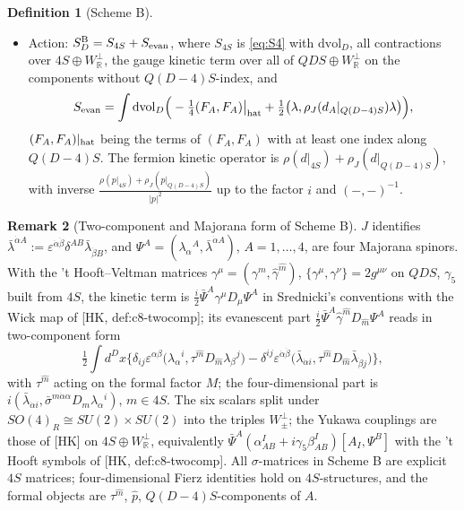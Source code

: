 \documentclass[11pt]{article}
\theoremstyle{definition}
\newtheorem{definition}{Definition}[section]
\newtheorem{remark}[definition]{Remark}
\numberwithin{equation}{section}
\begin{document}
\begin{definition}[Scheme B]
\begin{itemize}
\item Action: $S^{\rm B}_D=S_{4S}+S_{\rm evan}$, where $S_{4S}$ is \eqref{eq:S4} with $\mathrm{dvol}_D$, all contractions over $4S\oplus W^\perp_{\mathbb R}$, the gauge kinetic term over all of $QDS\oplus W^\perp_{\mathbb R}$ on the components without $Q(D{-}4)S$-index, and
\[
S_{\rm evan}=\int\mathrm{dvol}_D\Big(-\tfrac14(F_A,F_A)\big|_{\rm hat}+\tfrac12\big(\lambda,\rho_J(d_A|_{Q(D-4)S})\lambda\big)\Big),
\]
$(F_A,F_A)|_{\rm hat}$ being the terms of $(F_A,F_A)$ with at least one index along $Q(D{-}4)S$. The fermion kinetic operator is $\rho(d|_{4S})+\rho_J(d|_{Q(D-4)S})$, with inverse $\frac{\rho(p|_{4S})+\rho_J(p|_{Q(D-4)S})}{|p|^2}$ up to the factor $i$ and $(-,-)^{-1}$.
\end{itemize}
\end{definition}

\begin{remark}[Two-component and Majorana form of Scheme B]
\label{rem:B2c}
$J$ identifies $\bar\lambda^{\dot\alpha A}:=\varepsilon^{\dot\alpha\dot\beta}\delta^{AB}\bar\lambda_{\dot\beta B}$, and $\Psi^A=(\lambda_\alpha{}^A,\bar\lambda^{\dot\alpha A})$, $A=1,\dots,4$, are four Majorana spinors. With the 't Hooft--Veltman matrices $\gamma^\mu=(\gamma^m,\hat\gamma^{\hat m})$, $\{\gamma^\mu,\gamma^\nu\}=2g^{\mu\nu}$ on $QDS$, $\gamma_5$ built from $4S$, the kinetic term is $\frac i2\bar\Psi^A\gamma^\mu D_\mu\Psi^A$ in Srednicki's conventions with the Wick map of [HK, def:c8-twocomp]; its evanescent part $\frac i2\bar\Psi^A\hat\gamma^{\hat m}D_{\hat m}\Psi^A$ reads in two-component form
\[
\tfrac12\int d^Dx\Big\{\delta_{ij}\varepsilon^{\alpha\beta}\big(\lambda_\alpha{}^i,\tau^{\hat m}D_{\hat m}\lambda_\beta{}^j\big)-\delta^{ij}\varepsilon^{\dot\alpha\dot\beta}\big(\bar\lambda_{\dot\alpha i},\tau^{\hat m}D_{\hat m}\bar\lambda_{\dot\beta j}\big)\Big\},
\]
with $\tau^{\hat m}$ acting on the formal factor $M$; the four-dimensional part is $i(\bar\lambda_{\dot\alpha i},\bar\sigma^{m\dot\alpha\alpha}D_m\lambda_\alpha{}^i)$, $m\in 4S$. The six scalars split under $SO(4)_R\cong SU(2)\times SU(2)$ into the triples $W^\perp_\pm$; the Yukawa couplings are those of [HK] on $4S\oplus W^\perp_{\mathbb R}$, equivalently $\bar\Psi^A(\alpha^I_{AB}+i\gamma_5\beta^I_{AB})[A_I,\Psi^B]$ with the 't Hooft symbols of [HK, def:c8-twocomp]. All $\sigma$-matrices in Scheme B are explicit $4S$ matrices; four-dimensional Fierz identities hold on $4S$-structures, and the formal objects are $\tau^{\hat m}$, $\hat p$, $Q(D{-}4)S$-components of $A$.
\end{remark}
\end{document}
